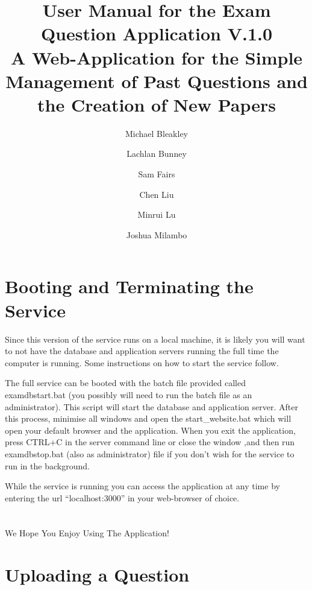\documentclass[12pt, a4paper, titlepage]{book}
\author{
    Michael Bleakley
  \and
    Lachlan Bunney
    \and
    Sam Fairs
    \and
    Chen Liu
	\and
	Minrui Lu
	\and
	Joshua Milambo
}
\begin{document}
\begin{titlepage}

\title{User Manual for the Exam Question Application V.1.0\\ \normalsize A Web-Application for the Simple Management of Past Questions and the Creation of New Papers}
\maketitle
\end{titlepage}
\tableofcontents
\frontmatter
\small
\chapter{Booting and Terminating the Service}
Since this version of the service runs on a local machine, it is likely you will want to not have the database and application servers running the full time the computer is running. Some instructions on how to start the service follow.

The full service can be booted with the batch file provided called examdbstart.bat (you possibly will need to run the batch file as an administrator). This script will start the database and application server. After this process, minimise all windows and open the start\_website.bat which will open your default browser and the application. When you exit the application, press CTRL+C in the server command line or close the window ,and then run examdbstop.bat (also as administrator) file if you don't wish for the service to run in the background. 

While the service is running you can access the application at any time by entering the url ``localhost:3000'' in your web-browser of choice.
\\\\\\
\large We Hope You Enjoy Using The Application!

\normalsize
\mainmatter
\chapter{Uploading a Question}
\end{document}
